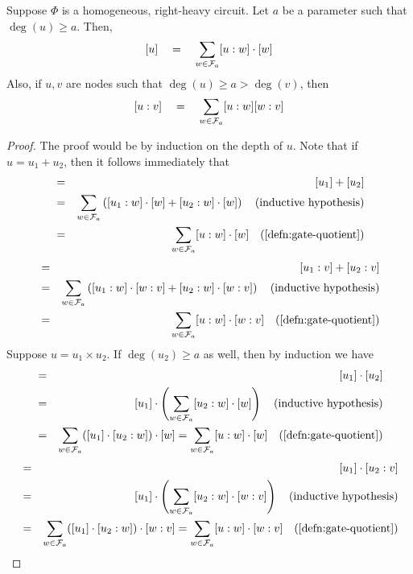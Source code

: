 \begin{lemma}
Suppose $\Phi$ is a homogeneous, right-heavy circuit. Let $a$ be a parameter such that $\deg(u) \geq a$. Then,
\begin{equation}\label{eqn:vsbr-for-u}
[u]\quad = \quad \sum_{w\in \mathcal{F}_a} [u:w] \cdot [w]
\end{equation}
Also, if $u,v$ are nodes such that $\deg(u) \geq a > \deg(v)$, then
\begin{equation}\label{eqn:vsbr-for-uv}
[u:v] \quad = \quad \sum_{w\in \mathcal{F}_a} [u:w] [w:v]
\end{equation}
\end{lemma}
\begin{proof}
The proof would be by induction on the depth of $u$. Note that if $u = u_1 + u_2$, then it follows immediately that 
\begin{eqnarray*}
  [u] &=& [u_1] + [u_2] \\
  &=& \sum_{w\in \mathcal{F}_a} \inparen{[u_1: w]\cdot [w]  + [u_2:w]\cdot [w]}\quad\text{(inductive hypothesis)}\\
  &=& \sum_{w\in \mathcal{F}_a} [u:w] \cdot [w] \quad\text{(\autoref{defn:gate-quotient})}
\end{eqnarray*}
\begin{eqnarray*}
  [u:v] &=& [u_1:v] + [u_2:v] \\
  &=& \sum_{w\in \mathcal{F}_a} \inparen{[u_1: w]\cdot [w:v]  + [u_2:w]\cdot [w:v]}\quad\text{(inductive hypothesis)}\\
  &=& \sum_{w\in \mathcal{F}_a} [u:w] \cdot [w:v] \quad\text{(\autoref{defn:gate-quotient})}
\end{eqnarray*}
Suppose $u = u_1 \times u_2$. If $\deg(u_2) \geq a$ as well, then by induction we have
\begin{eqnarray*}
[u] &=& [u_1] \cdot [u_2]\\
    &=& [u_1] \cdot \inparen{\sum_{w\in \mathcal{F}_a} [u_2:w]\cdot [w]} \quad\text{(inductive hypothesis)}\\
    &=& \sum_{w\in \mathcal{F}_a}([u_1]\cdot [u_2:w]) \cdot [w] = \sum_{w\in \mathcal{F}_a}[u:w] \cdot [w]\quad\text{(\autoref{defn:gate-quotient})}
\end{eqnarray*}
\begin{eqnarray*}
[u:v] &=& [u_1] \cdot [u_2:v]\\
    &=& [u_1] \cdot \inparen{\sum_{w\in \mathcal{F}_a} [u_2:w]\cdot [w:v]} \quad\text{(inductive hypothesis)}\\
    &=& \sum_{w\in \mathcal{F}_a}([u_1]\cdot [u_2:w]) \cdot [w:v] = \sum_{w\in \mathcal{F}_a}[u:w] \cdot [w:v]\quad\text{(\autoref{defn:gate-quotient})}
\end{eqnarray*}


\end{proof}
